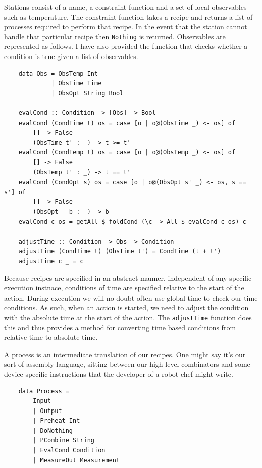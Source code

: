 \documentclass[11pt]{article}
\begin{document}
Stations consist of a name, a constraint function and a set of local observables such as temperature.
The constraint function takes a recipe and returns a list of processes required to perform that recipe.
In the event that the station cannot handle that particular recipe then \texttt{Nothing} is returned.
Observables are represented as follows. I have also provided the function that checks whether a
condition is true given a list of observables.

\begin{lstlisting}
    data Obs = ObsTemp Int
             | ObsTime Time
             | ObsOpt String Bool

    evalCond :: Condition -> [Obs] -> Bool
    evalCond (CondTime t) os = case [o | o@(ObsTime _) <- os] of
        [] -> False
        (ObsTime t' : _) -> t >= t'
    evalCond (CondTemp t) os = case [o | o@(ObsTemp _) <- os] of
        [] -> False
        (ObsTemp t' : _) -> t == t'
    evalCond (CondOpt s) os = case [o | o@(ObsOpt s' _) <- os, s == s'] of
        [] -> False
        (ObsOpt _ b : _) -> b
    evalCond c os = getAll $ foldCond (\c -> All $ evalCond c os) c

    adjustTime :: Condition -> Obs -> Condition
    adjustTime (CondTime t) (ObsTime t') = CondTime (t + t')
    adjustTime c _ = c
\end{lstlisting}

Because recipes are specified in an abstract manner, independent of any specific execution instnace,
conditions of time are specified relative to the start of the action. During execution we will no doubt
often use global time to check our time conditions. As such, when an action is started, we need to
adjust the condition with the absolute time at the start of the action. The \texttt{adjustTime} function
does this and thus provides a method for converting time based conditions from relative time to absolute time.

\medbreak

A process is an intermediate translation of our recipes. One might say it's our sort of assembly
language, sitting between our high level combinators and some device specific instructions that the
developer of a robot chef might write.

\begin{lstlisting}
    data Process =
        Input
        | Output
        | Preheat Int
        | DoNothing
        | PCombine String
        | EvalCond Condition
        | MeasureOut Measurement
\end{lstlisting}
\end{document}
